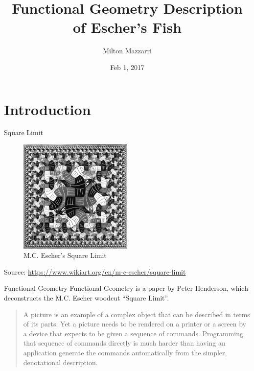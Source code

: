 \documentclass{beamer}
\title{Functional Geometry Description of Escher's Fish}
\date{Feb 1, 2017}
\author{Milton Mazzarri}
\institute{Houston Elixir Meetup}
\begin{document}
    \maketitle

    \section{Introduction}

    \begin{frame}{Square Limit}

        \begin{figure}
           \centering
            \includegraphics[width=0.5\textwidth]{./figs/square-limit}
            \caption{M.C. Escher's Square Limit\label{fig:square_limit}}
        \end{figure}
        {\footnotesize Source: \url{https://www.wikiart.org/en/m-c-escher/square-limit}}
    \end{frame}

    \begin{frame}{Functional Geometry}
        Functional Geometry is a paper by Peter Henderson\cite{Henderson82,Henderson02}, which deconstructs the M.C. Escher woodcut ``Square Limit''.
        \begin{quote}
            A picture is an example of a complex object that can be described
            in terms of its parts. Yet a picture needs to be rendered on a
            printer or a screen by a device that expects to be given a sequence
            of commands. Programming that sequence of commands directly is much
            harder than having an application generate the commands
            automatically from the simpler, denotational description.
        \end{quote}
    \end{frame}
\end{document}
